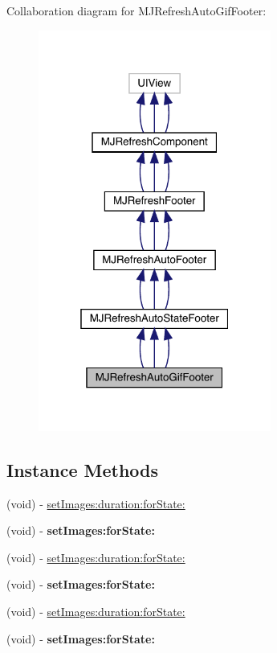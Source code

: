 Collaboration diagram for M\+J\+Refresh\+Auto\+Gif\+Footer\+:\nopagebreak
\begin{figure}[H]
\begin{center}
\leavevmode
\includegraphics[width=217pt]{interface_m_j_refresh_auto_gif_footer__coll__graph}
\end{center}
\end{figure}
\subsection*{Instance Methods}
\begin{DoxyCompactItemize}
\item 
(void) -\/ \mbox{\hyperlink{interface_m_j_refresh_auto_gif_footer_ae025ecc73c92e89cf24c92b6a9e75730}{set\+Images\+:duration\+:for\+State\+:}}
\item 
\mbox{\label{interface_m_j_refresh_auto_gif_footer_a9c70f0f1d9af2a390525906f7c91dd26}} 
(void) -\/ {\bfseries set\+Images\+:for\+State\+:}
\item 
(void) -\/ \mbox{\hyperlink{interface_m_j_refresh_auto_gif_footer_ae025ecc73c92e89cf24c92b6a9e75730}{set\+Images\+:duration\+:for\+State\+:}}
\item 
\mbox{\label{interface_m_j_refresh_auto_gif_footer_a9c70f0f1d9af2a390525906f7c91dd26}} 
(void) -\/ {\bfseries set\+Images\+:for\+State\+:}
\item 
(void) -\/ \mbox{\hyperlink{interface_m_j_refresh_auto_gif_footer_ae025ecc73c92e89cf24c92b6a9e75730}{set\+Images\+:duration\+:for\+State\+:}}
\item 
\mbox{\label{interface_m_j_refresh_auto_gif_footer_a9c70f0f1d9af2a390525906f7c91dd26}} 
(void) -\/ {\bfseries set\+Images\+:for\+State\+:}
\end{DoxyCompactItemize}
